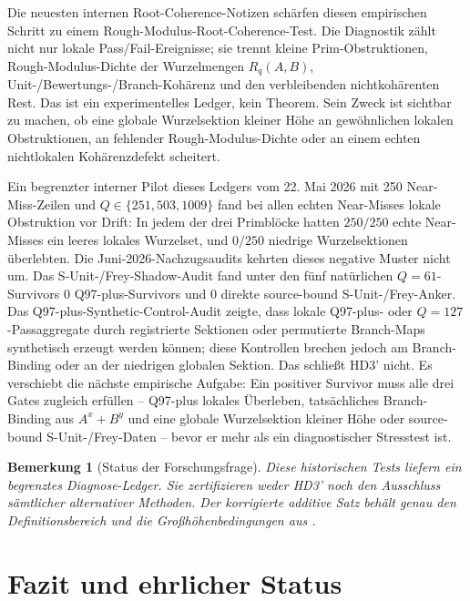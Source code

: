 \documentclass[11pt,a4paper]{article}
\newtheorem{remark}[theorem]{Bemerkung}
\begin{document}
Die neuesten internen Root-Coherence-Notizen schärfen diesen empirischen Schritt zu einem Rough-Modulus-Root-Coherence-Test. Die Diagnostik zählt nicht nur lokale Pass/Fail-Ereignisse; sie trennt kleine Prim-Obstruktionen, Rough-Modulus-Dichte der Wurzelmengen $R_q(A,B)$, Unit-/Bewertungs-/Branch-Kohärenz und den verbleibenden nichtkohärenten Rest. Das ist ein experimentelles Ledger, kein Theorem. Sein Zweck ist sichtbar zu machen, ob eine globale Wurzelsektion kleiner Höhe an gewöhnlichen lokalen Obstruktionen, an fehlender Rough-Modulus-Dichte oder an einem echten nichtlokalen Kohärenzdefekt scheitert.

Ein begrenzter interner Pilot dieses Ledgers vom 22. Mai 2026 mit 250 Near-Miss-Zeilen und $Q\in\{251,503,1009\}$ fand bei allen echten Near-Misses lokale Obstruktion vor Drift: In jedem der drei Primblöcke hatten $250/250$ echte Near-Misses ein leeres lokales Wurzelset, und $0/250$ niedrige Wurzelsektionen überlebten. Die Juni-2026-Nachzugsaudits kehrten dieses negative Muster nicht um. Das S-Unit-/Frey-Shadow-Audit fand unter den fünf natürlichen $Q=61$-Survivors $0$ Q97-plus-Survivors und $0$ direkte source-bound S-Unit-/Frey-Anker. Das Q97-plus-Synthetic-Control-Audit zeigte, dass lokale Q97-plus- oder $Q=127$-Passaggregate durch registrierte Sektionen oder permutierte Branch-Maps synthetisch erzeugt werden können; diese Kontrollen brechen jedoch am Branch-Binding oder an der niedrigen globalen Sektion. Das schließt HD3' nicht. Es verschiebt die nächste empirische Aufgabe: Ein positiver Survivor muss alle drei Gates zugleich erfüllen -- Q97-plus lokales Überleben, tatsächliches Branch-Binding aus $A^x+B^y$ und eine globale Wurzelsektion kleiner Höhe oder source-bound S-Unit-/Frey-Daten -- bevor er mehr als ein diagnostischer Stresstest ist.

\begin{remark}[Status der Forschungsfrage]
Diese historischen Tests liefern ein begrenztes Diagnose-Ledger.
Sie zertifizieren weder HD3' noch den Ausschluss sämtlicher
alternativer Methoden. Der korrigierte additive Satz behält genau
den Definitionsbereich und die Großhöhenbedingungen aus
.
\end{remark}

\section{Fazit und ehrlicher Status}
\end{document}

